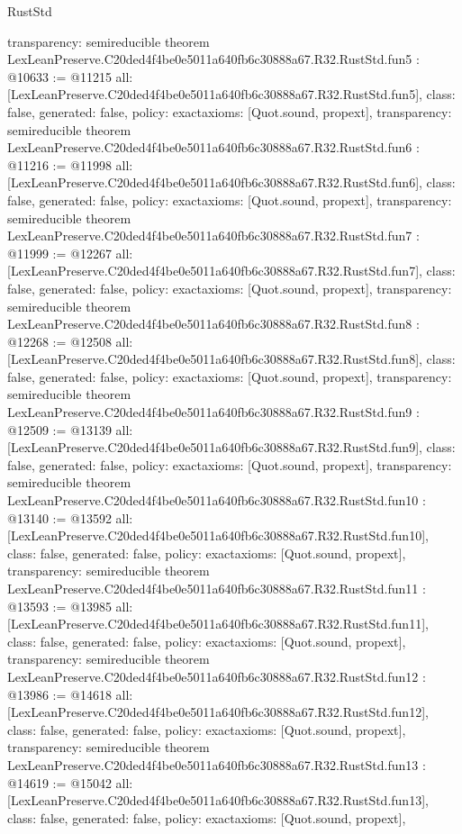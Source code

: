 \begin{lexlean}{RustStd}
\begin{coremodule}
{  transparency: semireducible
}
theorem LexLeanPreserve.C20ded4f4be0e5011a640fb6c30888a67.R32.RustStd.fun5 : @10633 := @11215 {
  all: [LexLeanPreserve.C20ded4f4be0e5011a640fb6c30888a67.R32.RustStd.fun5],
  class: false,
  generated: false,
  policy: exact{axioms: [Quot.sound, propext]},
  transparency: semireducible
}
theorem LexLeanPreserve.C20ded4f4be0e5011a640fb6c30888a67.R32.RustStd.fun6 : @11216 := @11998 {
  all: [LexLeanPreserve.C20ded4f4be0e5011a640fb6c30888a67.R32.RustStd.fun6],
  class: false,
  generated: false,
  policy: exact{axioms: [Quot.sound, propext]},
  transparency: semireducible
}
theorem LexLeanPreserve.C20ded4f4be0e5011a640fb6c30888a67.R32.RustStd.fun7 : @11999 := @12267 {
  all: [LexLeanPreserve.C20ded4f4be0e5011a640fb6c30888a67.R32.RustStd.fun7],
  class: false,
  generated: false,
  policy: exact{axioms: [Quot.sound, propext]},
  transparency: semireducible
}
theorem LexLeanPreserve.C20ded4f4be0e5011a640fb6c30888a67.R32.RustStd.fun8 : @12268 := @12508 {
  all: [LexLeanPreserve.C20ded4f4be0e5011a640fb6c30888a67.R32.RustStd.fun8],
  class: false,
  generated: false,
  policy: exact{axioms: [Quot.sound, propext]},
  transparency: semireducible
}
theorem LexLeanPreserve.C20ded4f4be0e5011a640fb6c30888a67.R32.RustStd.fun9 : @12509 := @13139 {
  all: [LexLeanPreserve.C20ded4f4be0e5011a640fb6c30888a67.R32.RustStd.fun9],
  class: false,
  generated: false,
  policy: exact{axioms: [Quot.sound, propext]},
  transparency: semireducible
}
theorem LexLeanPreserve.C20ded4f4be0e5011a640fb6c30888a67.R32.RustStd.fun10 : @13140 := @13592 {
  all: [LexLeanPreserve.C20ded4f4be0e5011a640fb6c30888a67.R32.RustStd.fun10],
  class: false,
  generated: false,
  policy: exact{axioms: [Quot.sound, propext]},
  transparency: semireducible
}
theorem LexLeanPreserve.C20ded4f4be0e5011a640fb6c30888a67.R32.RustStd.fun11 : @13593 := @13985 {
  all: [LexLeanPreserve.C20ded4f4be0e5011a640fb6c30888a67.R32.RustStd.fun11],
  class: false,
  generated: false,
  policy: exact{axioms: [Quot.sound, propext]},
  transparency: semireducible
}
theorem LexLeanPreserve.C20ded4f4be0e5011a640fb6c30888a67.R32.RustStd.fun12 : @13986 := @14618 {
  all: [LexLeanPreserve.C20ded4f4be0e5011a640fb6c30888a67.R32.RustStd.fun12],
  class: false,
  generated: false,
  policy: exact{axioms: [Quot.sound, propext]},
  transparency: semireducible
}
theorem LexLeanPreserve.C20ded4f4be0e5011a640fb6c30888a67.R32.RustStd.fun13 : @14619 := @15042 {
  all: [LexLeanPreserve.C20ded4f4be0e5011a640fb6c30888a67.R32.RustStd.fun13],
  class: false,
  generated: false,
  policy: exact{axioms: [Quot.sound, propext]},
}
\end{coremodule}
\end{lexlean}
